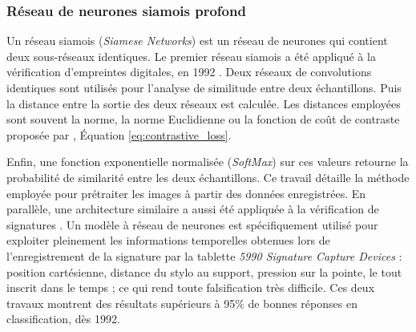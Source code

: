 
\subsubsection{Réseau de neurones siamois profond} \label{subsubsec:siamese}
Un réseau siamois (\textit{Siamese Networks}) est un réseau de neurones qui contient deux sous-réseaux identiques.
Le premier réseau siamois a été appliqué à la vérification d'empreintes digitales, en 1992 \cite{baldi_neural_1993}.
Deux réseaux de convolutions identiques sont utilisés pour l'analyse de similitude entre deux échantillons.
Puis la distance entre la sortie des deux réseaux est calculée.
Les distances employées sont souvent la norme, la norme Euclidienne ou la fonction de coût de contraste proposée par \citeauthor{hadsell_dimensionality_2006} \cite{hadsell_dimensionality_2006}, Équation \ref{eq:contrastive_loss}.

Enfin, une fonction exponentielle normalisée (\textit{SoftMax}) sur ces valeurs retourne la probabilité de similarité entre les deux échantillons.
Ce travail détaille la méthode employée pour prétraiter les images à partir des données enregistrées.
En parallèle, une architecture similaire a aussi été appliquée à la vérification de signatures \cite{bromley_signature_1993}.
Un modèle à réseau de neurones est spécifiquement utilisé pour exploiter pleinement les informations temporelles obtenues lors de l'enregistrement de la signature par la tablette \textit{5990 Signature Capture Devices} : position cartésienne, distance du stylo au support, pression sur la pointe, le tout inscrit dans le temps ; ce qui rend toute falsification très difficile.
Ces deux travaux montrent des résultats supérieurs à 95\% de bonnes réponses en classification, dès 1992.

